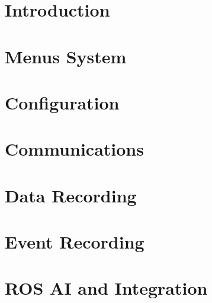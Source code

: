 \documentclass{report}
\begin{document}
\tableofcontents
\newpage

\chapter{Introduction}


\chapter{Menus System}


\chapter{Configuration}


\chapter{Communications}


\chapter{Data Recording}


\chapter{Event Recording}


%

\chapter{ROS AI and Integration}

\end{document}
